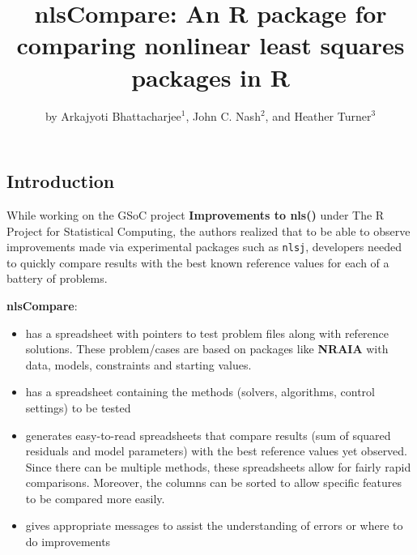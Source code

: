 \title{nlsCompare: An R package for comparing nonlinear least squares
packages in R}
\author{by Arkajyoti Bhattacharjee\(^1\), John C. Nash\(^2\), and Heather
Turner\(^3\)}

\maketitle


\hypertarget{introduction}{%
\subsection{Introduction}\label{introduction}}

While working on the GSoC project \textbf{Improvements to nls()} under
The R Project for Statistical Computing, the authors realized that to be
able to observe improvements made via experimental packages such as
\texttt{nlsj}, developers needed to quickly compare results with the
best known reference values for each of a battery of problems.

\textbf{nlsCompare}:

\begin{itemize}
\tightlist
\item
  has a spreadsheet with pointers to test problem files along with
  reference solutions. These problem/cases are based on packages like
  \textbf{NRAIA} with data, models, constraints and starting values.
\item
  has a spreadsheet containing the methods (solvers, algorithms, control
  settings) to be tested
\item
  generates easy-to-read spreadsheets that compare results (sum of
  squared residuals and model parameters) with the best reference values
  yet observed. Since there can be multiple methods, these spreadsheets
  allow for fairly rapid comparisons. Moreover, the columns can be
  sorted to allow specific features to be compared more easily.
\item
  gives appropriate messages to assist the understanding of errors or
  where to do improvements
\end{itemize}

